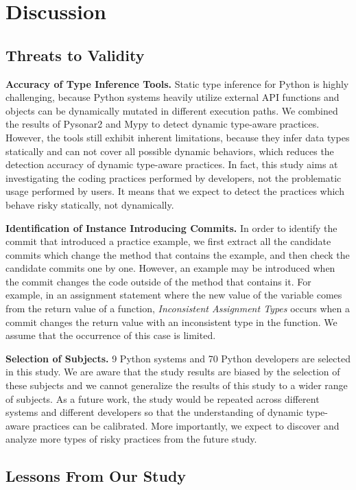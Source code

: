 
\section{Discussion}

\subsection{Threats to Validity}
\textbf{Accuracy of Type Inference Tools.}
Static type inference for Python is highly challenging, because Python systems heavily utilize external API functions and objects can be dynamically mutated in different execution paths. We combined the results of Pysonar2 and Mypy to detect dynamic type-aware practices. However, the tools still exhibit inherent limitations, because they infer data types statically and can not cover all possible dynamic behaviors, which reduces the detection accuracy of dynamic type-aware practices. In fact, this study aims at investigating the coding practices performed by developers, not the problematic usage performed by users. It means that we expect to detect the practices which behave risky statically, not dynamically.

\textbf{Identification of Instance Introducing Commits.} 
In order to identify the commit that introduced a practice example, we first extract all the candidate commits which change the method that contains the example, and then check the candidate commits one by one. However, an example may be introduced when the commit changes the code outside of the method that contains it. For example, in an assignment statement where the new value of the variable comes from the return value of a function, \emph{Inconsistent Assignment Types} occurs when  a commit changes the return value with an inconsistent type in the function. We assume that the occurrence of this case is limited. 


\textbf{Selection of Subjects.} 
9 Python systems and 70 Python developers are selected in this study. We are aware that the study results are biased by the selection of these subjects and we cannot generalize the results of this study to a wider range of subjects.
As a future work, the study would be repeated across different systems and different developers so that the understanding of dynamic type-aware practices can be calibrated. More importantly, we expect to discover and analyze more types of risky practices from the future study.


\subsection{Lessons From Our Study}

